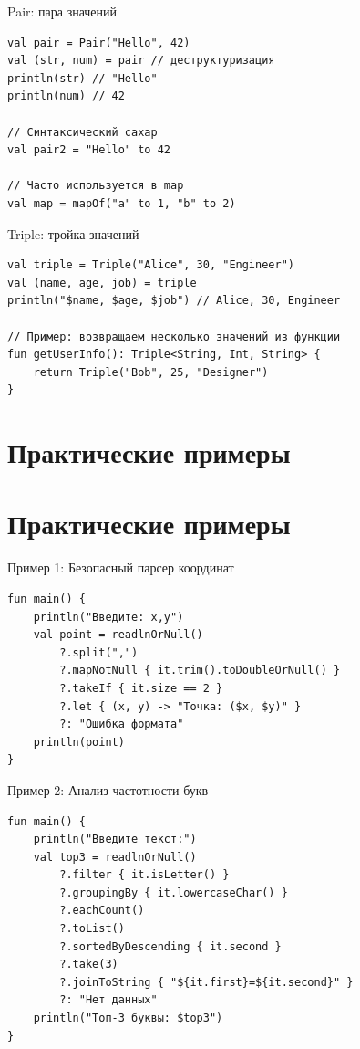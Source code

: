 \documentclass[aspectratio=169]{beamer}
\begin{document}
\begin{frame}[fragile]{Pair: пара значений}
\lstset{language=Kotlin}
\begin{lstlisting}
val pair = Pair("Hello", 42)
val (str, num) = pair // деструктуризация
println(str) // "Hello"
println(num) // 42

// Синтаксический сахар
val pair2 = "Hello" to 42

// Часто используется в map
val map = mapOf("a" to 1, "b" to 2)
\end{lstlisting}
\end{frame}

\begin{frame}[fragile]{Triple: тройка значений}
\lstset{language=Kotlin}
\begin{lstlisting}
val triple = Triple("Alice", 30, "Engineer")
val (name, age, job) = triple
println("$name, $age, $job") // Alice, 30, Engineer

// Пример: возвращаем несколько значений из функции
fun getUserInfo(): Triple<String, Int, String> {
    return Triple("Bob", 25, "Designer")
}
\end{lstlisting}
\end{frame}

\section{Практические примеры}
\section{Практические примеры}

\begin{frame}[fragile]{Пример 1: Безопасный парсер координат}
\lstset{language=Kotlin}
\begin{lstlisting}
fun main() {
    println("Введите: x,y")
    val point = readlnOrNull()
        ?.split(",")
        ?.mapNotNull { it.trim().toDoubleOrNull() }
        ?.takeIf { it.size == 2 }
        ?.let { (x, y) -> "Точка: ($x, $y)" }
        ?: "Ошибка формата"
    println(point)
}
\end{lstlisting}
\end{frame}

\begin{frame}[fragile]{Пример 2: Анализ частотности букв}
\lstset{language=Kotlin}
\begin{lstlisting}
fun main() {
    println("Введите текст:")
    val top3 = readlnOrNull()
        ?.filter { it.isLetter() }
        ?.groupingBy { it.lowercaseChar() }
        ?.eachCount()
        ?.toList()
        ?.sortedByDescending { it.second }
        ?.take(3)
        ?.joinToString { "${it.first}=${it.second}" }
        ?: "Нет данных"
    println("Топ-3 буквы: $top3")
}
\end{lstlisting}
\end{frame}
\end{document}
